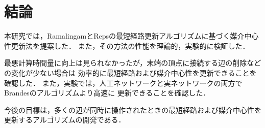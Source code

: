 \chapter{結論}
\label{chap:conclusion}

本研究では，RamalingamとRepsの最短経路更新アルゴリズムに基づく媒介中心性更新法を提案した．
また，その方法の性能を理論的，実験的に検証した．

最悪計算時間量に向上は見られなかったが，末端の頂点に接続する辺の削除などの変化が少ない場合は
効率的に最短経路および媒介中心性を更新できることを確認した．
また，実験では，人工ネットワークと実ネットワークの両方でBrandesのアルゴリズムより高速に
更新できることを確認した．

今後の目標は，多くの辺が同時に操作されたときの最短経路および媒介中心性を更新するアルゴリズムの開発である．
